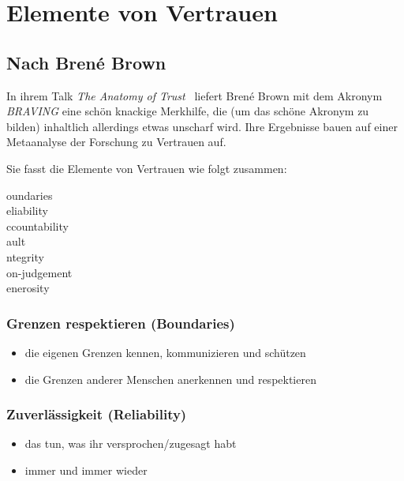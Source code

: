 \section{Elemente von Vertrauen}
\label{vertrauen-element}


\subsection{Nach Brené Brown}

In ihrem Talk \emph{The Anatomy of Trust}~\cite{anatomy-of-trust} liefert Brené Brown mit dem Akronym \emph{BRAVING} eine schön knackige Merkhilfe, die (um das schöne Akronym zu bilden) inhaltlich allerdings etwas unscharf wird. Ihre Ergebnisse bauen auf einer Metaanalyse der Forschung zu Vertrauen auf.

Sie fasst die Elemente von Vertrauen wie folgt zusammen:

oundaries \\
eliability \\
ccountability \\
ault \\
ntegrity \\
on-judgement \\
enerosity


\subsubsection{Grenzen respektieren (Boundaries)}

\begin{itemize}
  \item die eigenen Grenzen kennen, kommunizieren und schützen
  \item die Grenzen anderer Menschen anerkennen und respektieren
\end{itemize}



\subsubsection{Zuverlässigkeit (Reliability)}

\begin{itemize}
  \item das tun, was ihr versprochen/zugesagt habt
  \item immer und immer wieder
\end{itemize}


